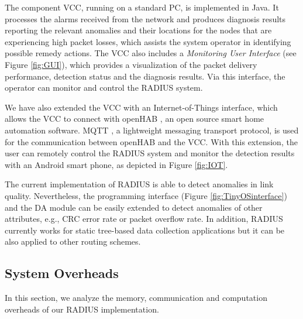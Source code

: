 The component VCC, running on a standard PC, is implemented in Java. It processes the alarms received from the network and produces diagnosis results reporting the relevant anomalies and their locations for the nodes that are experiencing high packet losses, which assists the system operator in identifying possible remedy actions. The VCC also includes a \textit{ Monitoring User Interface} (see Figure \ref{fig:GUI}), which provides a visualization of the packet delivery performance, detection status and the diagnosis results. Via this interface, the operator can monitor and control the RADIUS system.



We have also extended the VCC with an Internet-of-Things interface, which allows the VCC to connect with openHAB \cite{openHAB}, an open source smart home automation software. MQTT \cite{MQTT}, a lightweight messaging transport protocol, is used for the communication between openHAB and the VCC. With this extension, the user can remotely control the RADIUS system and monitor the detection results with an Android smart phone, as depicted in Figure \ref{fig:IOT}.



The current implementation of RADIUS is able to detect anomalies in link quality. Nevertheless, the programming interface (Figure \ref{fig:TinyOSinterface}) and the DA module can be easily extended to detect anomalies of other attributes, e.g., CRC error rate or packet overflow rate.
In addition, RADIUS currently works for static tree-based data collection applications but it can be also applied to other routing schemes. 




\subsection{System Overheads} \label{sec:overhead}
In this section, we analyze the memory, communication and computation overheads of our RADIUS implementation.


